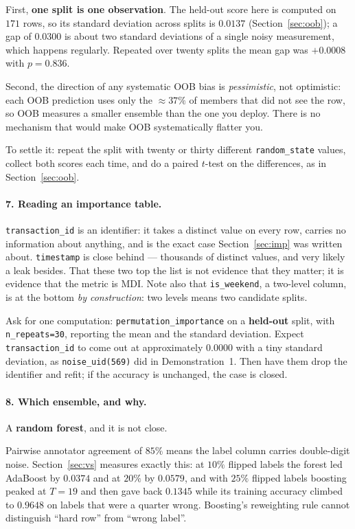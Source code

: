 \documentclass[11pt]{article}
\begin{document}
First, \textbf{one split is one observation}. The held-out score here is
computed on $171$ rows, so its standard deviation across splits is $0.0137$
(Section~\ref{sec:oob}); a gap of $0.0300$ is about two standard deviations of
a single noisy measurement, which happens regularly. Repeated over twenty
splits the mean gap was $+0.0008$ with $p = 0.836$.

Second, the direction of any systematic OOB bias is \emph{pessimistic}, not
optimistic: each OOB prediction uses only the $\approx 37\%$ of members that
did not see the row, so OOB measures a smaller ensemble than the one you
deploy. There is no mechanism that would make OOB systematically flatter you.

To settle it: repeat the split with twenty or thirty different
\texttt{random\_state} values, collect both scores each time, and do a paired
$t$-test on the differences, as in Section~\ref{sec:oob}.

\paragraph{7. Reading an importance table.}
\texttt{transaction\_id} is an identifier: it takes a distinct value on every
row, carries no information about anything, and is the exact case
Section~\ref{sec:imp} was written about. \texttt{timestamp} is close behind ---
thousands of distinct values, and very likely a leak besides. That these two
top the list is not evidence that they matter; it is evidence that the metric
is MDI. Note also that \texttt{is\_weekend}, a two-level column, is at the
bottom \emph{by construction}: two levels means two candidate splits.

Ask for one computation: \texttt{permutation\_importance} on a
\textbf{held-out} split, with \texttt{n\_repeats=30}, reporting the mean and
the standard deviation. Expect \texttt{transaction\_id} to come out at
approximately $0.0000$ with a tiny standard deviation, as
\texttt{noise\_uid(569)} did in Demonstration~1. Then have them drop the
identifier and refit; if the accuracy is unchanged, the case is closed.

\paragraph{8. Which ensemble, and why.}
A \textbf{random forest}, and it is not close.

Pairwise annotator agreement of $85\%$ means the label column carries
double-digit noise. Section~\ref{sec:vs} measures exactly this: at $10\%$
flipped labels the forest led AdaBoost by $0.0374$ and at $20\%$ by $0.0579$,
and with $25\%$ flipped labels boosting peaked at $T = 19$ and then gave back
$0.1345$ while its training accuracy climbed to $0.9648$ on labels that were a
quarter wrong. Boosting's reweighting rule cannot distinguish ``hard row''
from ``wrong label''.
\end{document}
